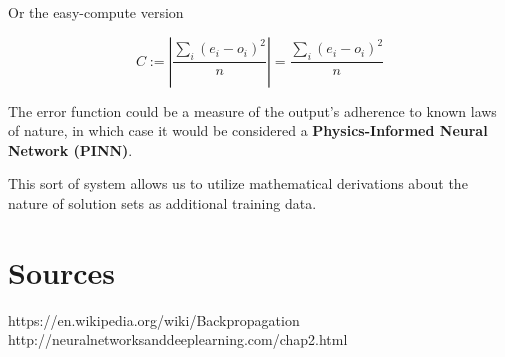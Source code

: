\documentclass[8pt]{amsart}
\begin{document}
Or the easy-compute version

\[
    C := | \frac{\sum_i{(e_i - o_i)^2}}{n} | = \frac{\sum_i{(e_i - o_i)^2}}{n}
\]

The error function could be a measure of the output's adherence to known
laws of nature, in which case it would be considered a \textbf{Physics-Informed
Neural Network (PINN)}.

This sort of system allows us to utilize mathematical derivations about
the nature of solution sets as additional training data.

\section{Sources}

https://en.wikipedia.org/wiki/Backpropagation \\
http://neuralnetworksanddeeplearning.com/chap2.html
\end{document}

